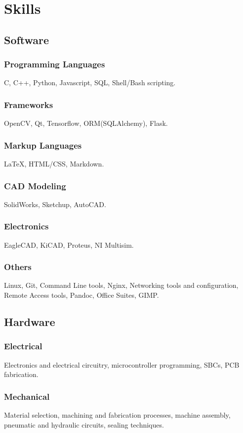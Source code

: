 \documentclass[a4paper]{article}
\begin{document}
	\section{Skills}
		\subsection{Software}
			\subsubsection{Programming Languages}
			C, C++, Python, Javascript, SQL, Shell/Bash scripting.
			\subsubsection{Frameworks}
			OpenCV, Qt, Tensorflow, ORM(SQLAlchemy), Flask.
			\subsubsection{Markup Languages}
			{\LaTeX}, HTML/CSS, Markdown.
			\subsubsection{CAD Modeling}	
			SolidWorks, Sketchup, AutoCAD.
			\subsubsection{Electronics}	
			EagleCAD, KiCAD, Proteus, NI Multisim.
			\subsubsection{Others}
			Linux, Git, Command Line tools, Nginx, Networking tools and configuration, \\Remote Access tools, Pandoc, Office Suites, GIMP.
		\subsection{Hardware}
			\subsubsection{Electrical}
			Electronics and electrical circuitry, microcontroller programming, SBCs, PCB fabrication.
			\subsubsection{Mechanical}
			Material selection, machining and fabrication processes, machine assembly, pneumatic and hydraulic circuits, sealing techniques.
\end{document}

